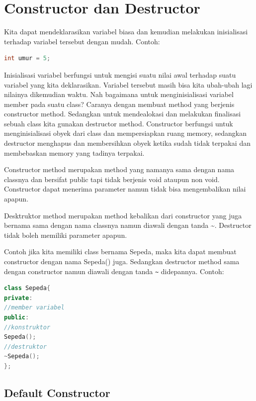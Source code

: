 \section{Constructor dan
Destructor}\label{constructor-dan-destructor}

Kita dapat mendeklarasikan variabel biasa dan kemudian melakukan
inisialisasi terhadap variabel tersebut dengan mudah. Contoh:

\begin{lstlisting}[language=c++]
int umur = 5;
\end{lstlisting}

Inisialisasi variabel berfungsi untuk mengisi suatu nilai awal terhadap
suatu variabel yang kita deklarasikan. Variabel tersebut masih bisa kita
ubah-ubah lagi nilainya dikemudian waktu. Nah bagaimana untuk
menginisialisasi variabel member pada suatu class? Caranya dengan
membuat method yang berjenis constructor method. Sedangkan untuk
mendealokasi dan melakukan finalisasi sebuah class kita gunakan
destructor method. Constructor berfungsi untuk menginisialisasi obyek
dari class dan mempersiapkan ruang memory, sedangkan destructor
menghapus dan membersihkan obyek ketika sudah tidak terpakai dan
membebaskan memory yang tadinya terpakai.

Constructor method merupakan method yang namanya sama dengan nama
classnya dan bersifat public tapi tidak berjenis void ataupun non void.
Constructor dapat menerima parameter namun tidak bisa mengembalikan
nilai apapun.

Desktruktor method merupakan method kebalikan dari constructor yang juga
bernama sama dengan nama classnya namun diawali dengan tanda
\textasciitilde{}. Destructor tidak boleh memiliki parameter apapun.

Contoh jika kita memiliki class bernama Sepeda, maka kita dapat membuat
constructor dengan nama Sepeda() juga. Sedangkan destructor method sama
dengan constructor namun diawali dengan tanda \texttt{\textasciitilde{}}
didepannya. Contoh:

\begin{lstlisting}[language=c++]
class Sepeda{
private:
//member variabel
public:
//konstruktor
Sepeda();
//destruktor
~Sepeda();
};
\end{lstlisting}

\subsection{Default Constructor}\label{default-constructor}


